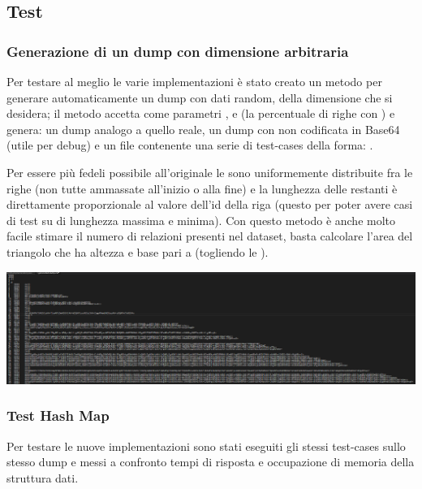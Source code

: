 \subsection{Test}

\subsubsection{Generazione di un dump con dimensione arbitraria}
Per testare al meglio le varie implementazioni è stato creato un metodo per generare automaticamente un dump con dati random, della dimensione che si desidera;
il metodo  accetta come parametri ,  e  (la percentuale di righe con ) e genera: un dump 
analogo a quello reale, un dump con  non codificata in Base64 (utile per debug) e un file contenente una serie di test-cases della forma: 
.

Per essere più fedeli possibile all'originale le  sono uniformemente distribuite fra le righe (non tutte ammassate all'inizio o alla fine) e la lunghezza delle restanti 
è direttamente proporzionale al valore dell'id della riga (questo per poter avere casi di test su  di lunghezza massima e minima). 
Con questo metodo è anche molto facile stimare il numero di relazioni presenti nel dataset, basta calcolare l'area del triangolo che ha altezza e base pari a  (togliendo 
le ).

\begin{center}
    \includegraphics[scale=0.45]{Sources/Img/c03_01.png}
\end{center}

\subsubsection{Test Hash Map}
Per testare le nuove implementazioni sono stati eseguiti gli stessi test-cases sullo stesso dump e messi a confronto tempi di risposta e occupazione di memoria della struttura dati.\\

